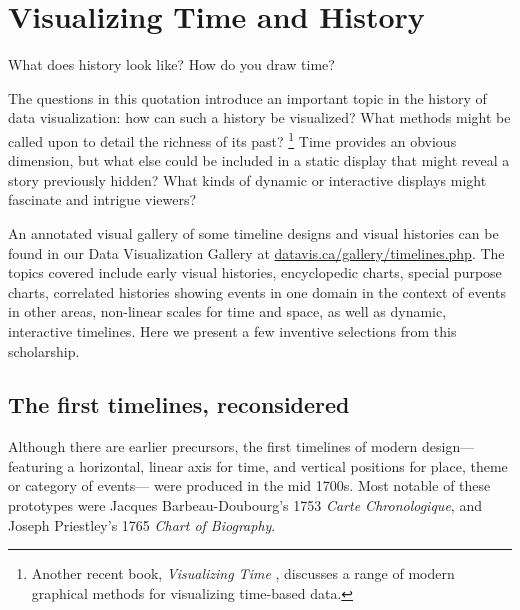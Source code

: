 \section{Visualizing Time and History}\label{sec:vistime}

\epigraph{What does history look like?  How do you draw time?}{\citet[p. 10]{RosenbergGrafton:2010}}
The questions in this quotation introduce an important topic in the history of data visualization:  how can such a history be visualized? 
What methods might be called upon to detail the richness of its past?%
\footnote{Another recent book, \emph{Visualizing Time} \citep{Wills:2012}, discusses a range of  modern graphical methods for visualizing time-based data.} 
Time provides an obvious dimension, but what else could be included in a static display that might reveal a story previously hidden? 
What kinds of dynamic or interactive displays might fascinate and intrigue viewers? 

An annotated visual gallery of some timeline designs and visual histories can be found in our Data Visualization Gallery at \url{datavis.ca/gallery/timelines.php}. 
The topics covered include early visual histories, encyclopedic charts, special purpose charts, 
correlated histories showing events in one domain in the context of events in other areas, non-linear scales for time and space, 
as well as dynamic, interactive timelines.  Here we present a few inventive selections from this scholarship.

\subsection{The first timelines, reconsidered}
Although there are earlier precursors, the first timelines of modern design--- featuring a horizontal, linear axis for time, 
and vertical positions for place, theme or category of events--- were produced in the mid 1700s. 
Most notable of these prototypes were Jacques Barbeau-Doubourg's 1753 \emph{Carte Chronologique}, and Joseph Priestley's 1765 \emph{Chart of Biography}.

